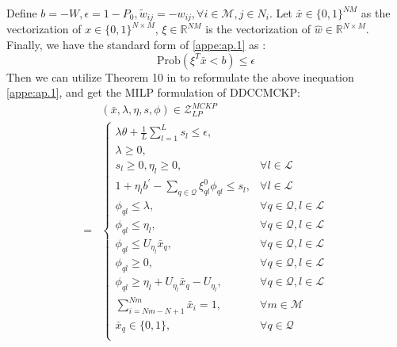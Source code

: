 \documentclass[lettersize,journal]{IEEEtran}
\begin{document}
Define $b=-W, \epsilon = 1-P_0, \tilde{w}_{ij}=-w_{ij}, \forall i \in \mathcal{M}, j\in N_{i}$. 
Let $\bar{x}\in\{0,1\}^{NM}$ as the vectorization of $x\in\{0,1\}^{N\times M}$, $\xi \in\mathbb{R}^{NM}$ is the vectorization of $\hat{w}\in\mathbb{R}^{N\times M}$. 
Finally, we have the standard form of \ref{appe:ap.1} as \cite{ji2021data}:
\begin{equation}\label{appe:ap.3}
    \text{Prob}(\xi^{T}\bar{x}< b)\leq \epsilon
\end{equation}
Then we can utilize Theorem 10 in \cite{ji2021data} to reformulate the above inequation \ref{appe:ap.1}, and get the MILP formulation of DDCCMCKP: 
\begin{equation}
\begin{aligned}
    &(\bar{x},\lambda,\eta,s,\phi)\in \mathcal{Z}_{LP}^{MCKP}\\
    =&\left\{
        \begin{array}{lr}
        \lambda \theta+\frac{1}{L}\sum _{l=1}^L s_l\leq \epsilon, & \\
        \lambda\geq 0, &\\
        s_l\geq 0,\eta_l\geq 0,& \forall l\in \mathcal{L}\\
        1+\eta_lb^{'}-\sum_{q\in\mathcal{Q}} \xi_{ql}^0\phi_{ql}\leq s_l,&\forall l\in \mathcal{L}\\
        \phi_{ql}\leq \lambda, &\forall q\in\mathcal{Q}, l\in \mathcal{L}\\
        \phi_{ql}\leq \eta_l, &\forall q\in\mathcal{Q}, l\in \mathcal{L}\\
        \phi_{ql}\leq U_{\eta_l}\bar{x}_q, &\forall q\in\mathcal{Q}, l\in \mathcal{L}\\
        \phi_{ql}\geq 0, &\forall q\in\mathcal{Q}, l\in \mathcal{L}\\
        \phi_{ql}\geq \eta_l+U_{\eta_{l}}\bar{x}_q -U_{\eta_{l}}, &\forall q\in\mathcal{Q}, l\in \mathcal{L}\\
        \sum _{i=Nm-N+1}^{Nm} \bar{x}_i = 1,&\forall m\in\mathcal{M}\\
        \bar{x}_q \in \{0,1\},&\forall q\in\mathcal{Q}\\
        \end{array}
    \right.
    \label{MILP}
\end{aligned}
\end{equation}
\end{document}
